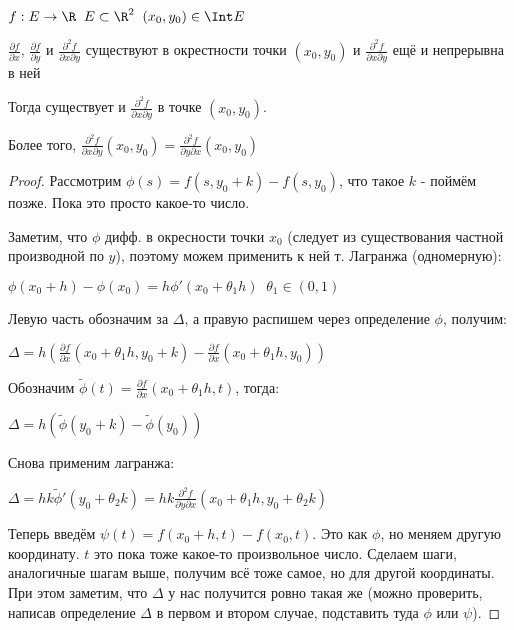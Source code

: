 \begin{theorem}\slashns
	
	$f: E \to \R \;\; E\subset \R^2 \;\; (x_0, y_0)  \in \Int E$
	
	$\frac{\partial f}{\partial x} $,
	$\frac{\partial f}{\partial y} $ и 
	$\frac{\partial^2 f}{\partial x \partial y} $ 
	существуют в окрестности точки $(x_0, y_0)$ и $\frac{\partial^2 f}{\partial x \partial y} $ ещё и непрерывна в ней
	
	
	Тогда существует и $\frac{\partial^2 f}{\partial x \partial y}$ в точке $(x_0, y_0)$. 

	Более того, $\frac{\partial^2 f}{\partial x \partial y}(x_0, y_0) = \frac{\partial^2 f}{\partial y \partial x}(x_0, y_0)$
\end{theorem}

\begin{proof}\slashns

	Рассмотрим $\phi(s) = f(s, y_0 + k) - f(s, y_0)$, что такое $k$ - поймём позже. Пока это просто какое-то число.

	Заметим, что $\phi$ дифф. в окресности точки $x_0$ (следует из существования частной производной по $y$), поэтому можем применить к ней т. Лагранжа (одномерную):
	
	$\phi(x_0 + h) - \phi(x_0) = h \phi'(x_0 + \theta_1 h) \;\; \theta_1 \in (0,1)$

	Левую часть обозначим за $\Delta$, а правую распишем через определение $\phi$, получим:

	$\Delta = h(\frac{\partial f}{\partial x} (x_0 + \theta_1 h, y_0 + k) - \frac{\partial f}{\partial x}(x_0 + \theta_1h, y_0)) $

	Обозначим $\tilde{\phi}(t) = \frac{\partial f}{\partial x} (x_0 + \theta_1 h, t)$, тогда:

	$\Delta = h(\tilde{\phi}(y_0+k) - \tilde{\phi}(y_0))$

	Снова применим лагранжа:

	$\Delta = hk\tilde{\phi}'(y_0 + \theta_2 k) = hk \frac{\partial^2 f}{\partial y \partial x} (x_0 + \theta_1 h, y_0 + \theta_2 k)$
	
	
	Теперь введём $\psi(t) = f(x_0 + h, t) - f(x_0, t)$. Это как $\phi$, но меняем другую координату. $t$ это пока тоже какое-то произвольное число. Сделаем шаги, аналогичные шагам выше, получим всё тоже самое, но для другой координаты. При этом заметим, что $\Delta$ у нас получится ровно такая же (можно проверить, написав определение $\Delta$ в первом и втором случае, подставить туда $\phi$ или $\psi$). 


\end{proof}

